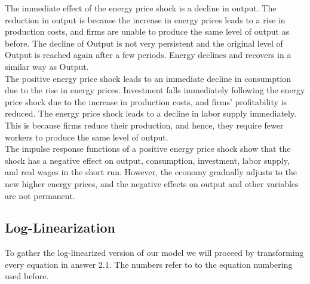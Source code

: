 \documentclass[a4paper,11pt]{article}
\begin{document}
The immediate effect of the energy price shock is a decline in output. The reduction in output is because the increase in energy prices leads to a rise in production costs, and firms are unable to produce the same level of output as before. The decline of Output is not very persistent and the original level of Output is reached again after a few periods. Energy declines and recovers in a similar way as Output.\\ 

The positive energy price shock leads to an immediate decline in consumption due to the rise in energy prices. Investment falls immediately following the energy price shock due to the increase in production costs, and firms' profitability is reduced. The energy price shock leads to a decline in labor supply immediately. This is because firms reduce their production, and hence, they require fewer workers to produce the same level of output.\\  

The impulse response functions of a positive energy price shock  show that the shock has a negative effect on output, consumption, investment, labor supply, and real wages in the short run. However, the economy gradually adjusts to the new higher energy prices, and the negative effects on output and other variables are not permanent.

\pagebreak
\subsection{Log-Linearization}
To gather the log-linearized version of our model we will proceed by transforming every equation in answer 2.1. The numbers refer to to the equation numbering used before.\\
\end{document}
